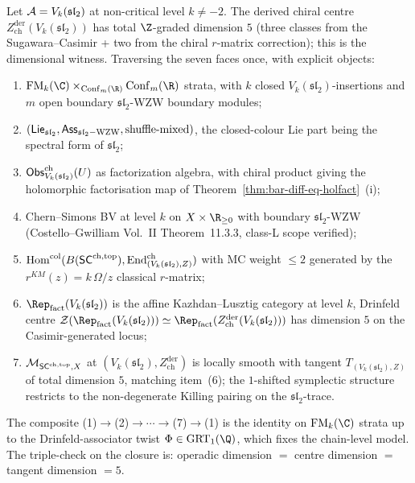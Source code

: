 \begin{remark}\label{rem:heptagon-witness-vk-sl2}%
Let $\mathcal{A}=V_k(\mathfrak{sl}_2)$ at non-critical level $k\neq -2$. The derived
chiral centre $Z^{\mathrm{der}}_{\mathrm{ch}}(V_k(\mathfrak{sl}_2))$ has total
$\Z$-graded dimension $5$ (three classes from the
Sugawara--Casimir + two from the chiral $r$-matrix correction);
this is the dimensional witness. Traversing the seven faces
once, with explicit objects:
\begin{enumerate}[label=\textup{(\arabic*)}]
\item $\FM_k(\C)\times_{\Conf_m(\R)}\Conf_m(\R)$ strata, with
$k$ closed $V_k(\mathfrak{sl}_2)$-insertions and $m$ open boundary $\mathfrak{sl}_2$-WZW
boundary modules;
\item $(\mathsf{Lie}_{\mathfrak{sl}_2},\mathsf{Ass}_{\mathfrak{sl}_2-\mathrm{WZW}},\text{shuffle-mixed})$,
the closed-colour Lie part being the spectral form of $\mathfrak{sl}_2$;
\item $\mathsf{Obs}^{\mathrm{ch}}_{V_k(\mathfrak{sl}_2)}(U)$ as factorization
algebra, with chiral product giving the
holomorphic factorisation map of
Theorem~\ref{thm:bar-diff-eq-holfact}~(i);
\item Chern--Simons BV at level $k$ on $X\times\R_{\geq 0}$ with
boundary $\mathfrak{sl}_2$-WZW (Costello--Gwilliam Vol.~II Theorem~11.3.3,
class-L scope verified);
\item $\mathrm{Hom}^{\mathrm{col}}(B(\mathsf{SC}^{\mathrm{ch},\mathrm{top}}),
\mathrm{End}^{\mathrm{ch}}_{(V_k(\mathfrak{sl}_2),Z)})$ with MC weight $\leq 2$
generated by the $r^{KM}(z)=k\,\Omega/z$ classical $r$-matrix;
\item $\Rep_{\mathrm{fact}}(V_k(\mathfrak{sl}_2))$ is the affine
Kazhdan--Lusztig category at level $k$, Drinfeld centre
$\cZ(\Rep_{\mathrm{fact}}(V_k(\mathfrak{sl}_2)))\simeq\Rep_{\mathrm{fact}}(
Z^{\mathrm{der}}_{\mathrm{ch}}(V_k(\mathfrak{sl}_2)))$ has dimension $5$ on the
Casimir-generated locus;
\item $\mathcal{M}_{\mathsf{SC}^{\mathrm{ch},\mathrm{top}},X}$ at $(V_k(\mathfrak{sl}_2),Z^{\mathrm{der}}_{\mathrm{ch}})$
is locally smooth with tangent $T_{(V_k(\mathfrak{sl}_2),Z)}$ of total dimension
$5$, matching item~(6); the $1$-shifted symplectic structure
restricts to the non-degenerate Killing pairing on the
$\mathfrak{sl}_2$-trace.
\end{enumerate}
The composite (1)$\to$(2)$\to\cdots\to$(7)$\to$(1) is the identity on
$\FM_k(\C)$ strata up to the Drinfeld-associator twist
$\Phi\in\mathrm{GRT}_1(\Q)$, which fixes the chain-level model. The
triple-check on the closure is: operadic dimension $=$
centre dimension $=$ tangent dimension $=5$.
\end{remark}

